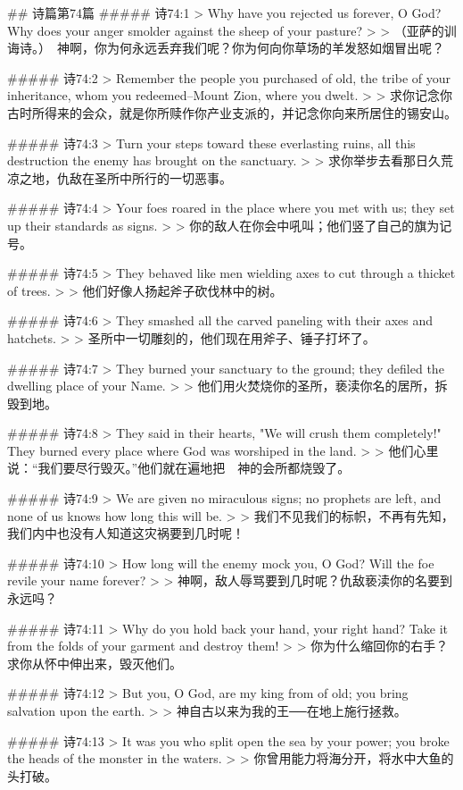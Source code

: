 ## 诗篇第74篇
##### 诗74:1
> Why have you rejected us forever, O God? Why does your anger smolder against the sheep of your pasture?
>
> （亚萨的训诲诗。）　神啊，你为何永远丢弃我们呢？你为何向你草场的羊发怒如烟冒出呢？


##### 诗74:2
> Remember the people you purchased of old, the tribe of your inheritance, whom you redeemed--Mount Zion, where you dwelt.
>
> 求你记念你古时所得来的会众，就是你所赎作你产业支派的，并记念你向来所居住的锡安山。


##### 诗74:3
> Turn your steps toward these everlasting ruins, all this destruction the enemy has brought on the sanctuary.
>
> 求你举步去看那日久荒凉之地，仇敌在圣所中所行的一切恶事。


##### 诗74:4
> Your foes roared in the place where you met with us; they set up their standards as signs.
>
> 你的敌人在你会中吼叫；他们竖了自己的旗为记号。


##### 诗74:5
> They behaved like men wielding axes to cut through a thicket of trees.
>
> 他们好像人扬起斧子砍伐林中的树。


##### 诗74:6
> They smashed all the carved paneling with their axes and hatchets.
>
> 圣所中一切雕刻的，他们现在用斧子、锤子打坏了。


##### 诗74:7
> They burned your sanctuary to the ground; they defiled the dwelling place of your Name.
>
> 他们用火焚烧你的圣所，亵渎你名的居所，拆毁到地。


##### 诗74:8
> They said in their hearts, "We will crush them completely!" They burned every place where God was worshiped in the land.
>
> 他们心里说：“我们要尽行毁灭。”他们就在遍地把　神的会所都烧毁了。


##### 诗74:9
> We are given no miraculous signs; no prophets are left, and none of us knows how long this will be.
>
> 我们不见我们的标帜，不再有先知，我们内中也没有人知道这灾祸要到几时呢！


##### 诗74:10
> How long will the enemy mock you, O God? Will the foe revile your name forever?
>
> 神啊，敌人辱骂要到几时呢？仇敌亵渎你的名要到永远吗？


##### 诗74:11
> Why do you hold back your hand, your right hand? Take it from the folds of your garment and destroy them!
>
> 你为什么缩回你的右手？求你从怀中伸出来，毁灭他们。


##### 诗74:12
> But you, O God, are my king from of old; you bring salvation upon the earth.
>
> 神自古以来为我的王──在地上施行拯救。


##### 诗74:13
> It was you who split open the sea by your power; you broke the heads of the monster in the waters.
>
> 你曾用能力将海分开，将水中大鱼的头打破。


